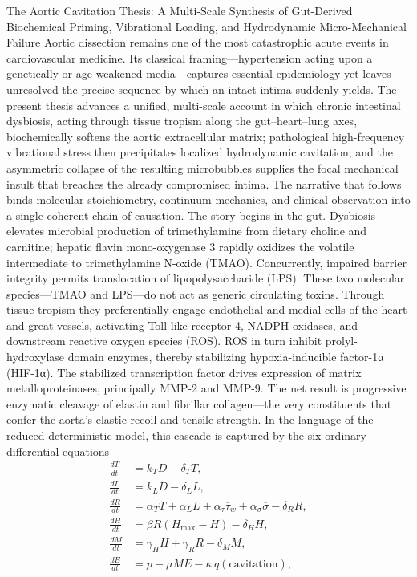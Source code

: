 The Aortic Cavitation Thesis: A Multi-Scale Synthesis of Gut-Derived Biochemical Priming, Vibrational Loading, and Hydrodynamic Micro-Mechanical Failure
Aortic dissection remains one of the most catastrophic acute events in cardiovascular medicine. Its classical framing—hypertension acting upon a genetically or age-weakened media—captures essential epidemiology yet leaves unresolved the precise sequence by which an intact intima suddenly yields. The present thesis advances a unified, multi-scale account in which chronic intestinal dysbiosis, acting through tissue tropism along the gut–heart–lung axes, biochemically softens the aortic extracellular matrix; pathological high-frequency vibrational stress then precipitates localized hydrodynamic cavitation; and the asymmetric collapse of the resulting microbubbles supplies the focal mechanical insult that breaches the already compromised intima. The narrative that follows binds molecular stoichiometry, continuum mechanics, and clinical observation into a single coherent chain of causation.
The story begins in the gut. Dysbiosis elevates microbial production of trimethylamine from dietary choline and carnitine; hepatic flavin mono-oxygenase 3 rapidly oxidizes the volatile intermediate to trimethylamine N-oxide (TMAO). Concurrently, impaired barrier integrity permits translocation of lipopolysaccharide (LPS). These two molecular species—TMAO and LPS—do not act as generic circulating toxins. Through tissue tropism they preferentially engage endothelial and medial cells of the heart and great vessels, activating Toll-like receptor 4, NADPH oxidases, and downstream reactive oxygen species (ROS). ROS in turn inhibit prolyl-hydroxylase domain enzymes, thereby stabilizing hypoxia-inducible factor-1α (HIF-1α). The stabilized transcription factor drives expression of matrix metalloproteinases, principally MMP-2 and MMP-9. The net result is progressive enzymatic cleavage of elastin and fibrillar collagen—the very constituents that confer the aorta’s elastic recoil and tensile strength. In the language of the reduced deterministic model, this cascade is captured by the six ordinary differential equations
\[
\begin{align*}
\frac{dT}{dt}&=k_TD-\delta_TT,\\
\frac{dL}{dt}&=k_LD-\delta_LL,\\
\frac{dR}{dt}&=\alpha_TT+\alpha_LL+\alpha_\tau\overline{\tau}_w+\alpha_\sigma\overline{\sigma}-\delta_RR,\\
\frac{dH}{dt}&=\beta R(H_{\max}-H)-\delta_HH,\\
\frac{dM}{dt}&=\gamma_HH+\gamma_RR-\delta_MM,\\
\frac{dE}{dt}&=p-\mu ME-\kappa\,q(\text{cavitation}),
\end{align*}
\]
